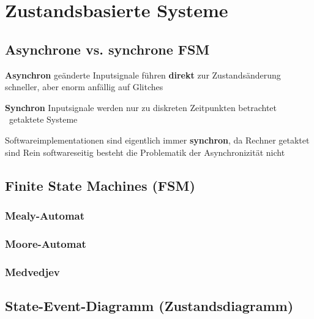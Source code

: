 \section{Zustandsbasierte Systeme}

\subsection{Asynchrone vs. synchrone FSM}

\begin{minipage}[t]{0.48\columnwidth}
    \raggedright
    \begin{outline}
        \1 \textbf{Asynchron}
            \2 geänderte Inputsignale führen \textbf{direkt} zur Zustandsänderung
            \2 schneller, aber enorm anfällig auf Glitches
    \end{outline}
\end{minipage}
\hfill
\begin{minipage}[t]{0.48\columnwidth}
    \raggedright
    \begin{outline}
        \1 \textbf{Synchron}
            \2 Inputsignale werden nur zu diskreten Zeitpunkten betrachtet \\
                \textrightarrow\ getaktete Systeme
    \end{outline}
\end{minipage}

\vspace{0.2cm}
\begin{outline}
    \1 Softwareimplementationen sind eigentlich immer \textbf{synchron}, da Rechner getaktet sind
    \1 Rein softwareseitig besteht die Problematik der Asynchronizität nicht
\end{outline}


\subsection{Finite State Machines (FSM)}


\subsubsection{Mealy-Automat}

\subsubsection{Moore-Automat}

\subsubsection{Medvedjev}


\subsection{State-Event-Diagramm (Zustandsdiagramm)}





